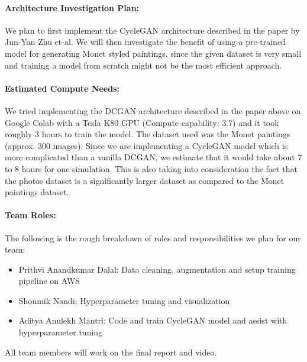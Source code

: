 \documentclass[11pt]{article}
\begin{document}
    \paragraph{Architecture Investigation Plan:}  We plan to first implement the CycleGAN architecture described in the paper by Jun-Yan Zhu et-al. We will then investigate the benefit of using a pre-trained model for generating Monet styled paintings, since the given dataset is very small and training a model from scratch might not be the most efficient approach.
    \paragraph{Estimated Compute Needs:} We tried implementing the DCGAN architecture described in the paper above on Google Colab with a Tesla K80 GPU (Compute capability: 3.7) and it took roughly 3 hours to train the model.
    The dataset used was the Monet paintings (approx. 300 images). Since we are implementing a CycleGAN model which is more complicated than a vanilla DCGAN, we estimate that it would take about 7 to 8 hours for one simulation.
    This is also taking into consideration the fact that the photos dataset is a significantly larger dataset as compared to the Monet paintings dataset.

    \paragraph{Team Roles:} The following is the rough breakdown of roles and responsibilities we plan for our team:
    \begin{itemize}
        \item Prithvi Anandkumar Dalal: Data cleaning, augmentation and setup training pipeline on AWS
        \item Shoumik Nandi: Hyperparameter tuning and visualization
        \item Aditya Anulekh Mantri: Code and train CycleGAN model and assist with hyperparameter tuning
    \end{itemize}
    All team members will work on the final report and video.

\end{document}
